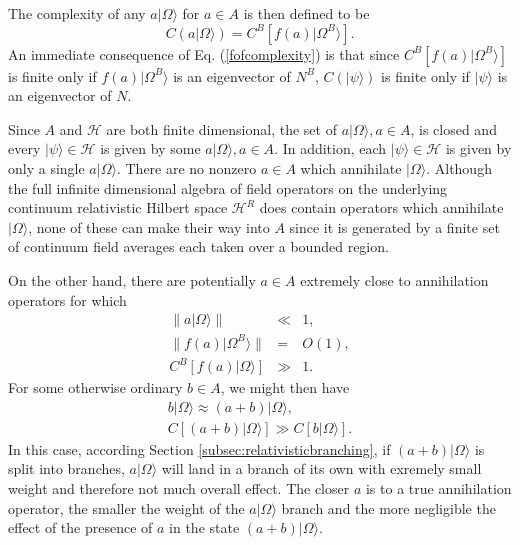 \documentclass[12pt,amsmath,amssymb,onecolumn]{revtex4-2}
\begin{document}
The complexity of any $ a|\Omega \rangle $ for $a \in A$ is then defined to be
\begin{equation}
 \label{fofcomplexity}
 C(a |\Omega \rangle ) =  C^B[ f(a) |\Omega^B \rangle ].
\end{equation}
An immediate consequence of Eq. (\ref{fofcomplexity}) is that
since $C^B[ f(a) |\Omega^B \rangle ]$ is finite only if $ f(a) |\Omega^B \rangle $ is an
eigenvector of $N^B$, $C(|\psi \rangle )$ is finite only if $|\psi \rangle $ is an eigenvector of $N$.

Since $A$ and $\mathcal{H}$ are both finite dimensional, the set of
$a |\Omega \rangle , a \in A$, is closed and every $|\psi \rangle  \in \mathcal{H}$
is given by some $a |\Omega \rangle , a \in A$. In addition, each
$|\psi \rangle  \in \mathcal{H}$ is given by only a single $a |\Omega \rangle $.
There are no nonzero $a \in A$ which annihilate $|\Omega \rangle $. 
Although the
full infinite dimensional
algebra of field operators on the 
underlying continuum relativistic Hilbert space $\mathcal{H}^R$ does
contain operators which annihilate $|\Omega \rangle $, none of these can make
their way into $A$ since it is generated by a finite set of
continuum field averages each taken over a bounded region.

On the other hand, there are potentially $a \in A$
extremely close to annihilation operators for which
\begin{subequations}
  \begin{eqnarray}
\label{asmall}
    \parallel a |\Omega \rangle  \parallel &\ll& 1, \\
\label{fasmall}
    \parallel f( a) |\Omega^B \rangle  \parallel &=& O(1), \\
\label{canotsmall}
    C^B[ f(a) |\Omega \rangle ] &\gg& 1.
  \end{eqnarray}
\end{subequations}
For some otherwise ordinary $b \in A$, we might then have
\begin{subequations}
  \begin{eqnarray}
\label{anearb}
    b|\Omega \rangle  \approx (a + b) |\Omega \rangle  , \\
\label{canotsmall1}
    C[ (a + b)  |\Omega \rangle ] \gg C[ b |\Omega \rangle ].
  \end{eqnarray}
\end{subequations}
In this case, according
Section \ref{subsec:relativisticbranching}, if
$(a + b) |\Omega \rangle $ is split into branches, $a |\Omega \rangle $ will
land in a branch of its own with exremely small weight
and therefore not much overall effect. The closer
$a$ is to a true annihilation operator, the smaller
the weight of the $a |\Omega \rangle $ branch and
the more negligible the effect of the presence of $a$
in the state $(a + b) |\Omega \rangle $.
\end{document}
